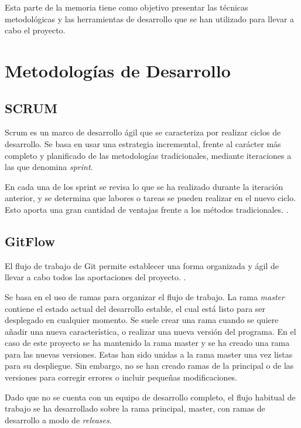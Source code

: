 
Esta parte de la memoria tiene como objetivo presentar las técnicas metodológicas y las herramientas de desarrollo que se han utilizado para llevar a cabo el proyecto. 



\section{Metodologías de Desarrollo}

\subsection{SCRUM}
\label{sub:scrum}

Scrum es un marco de desarrollo ágil que se caracteriza por realizar ciclos de desarrollo. Se basa en usar una estrategia incremental, frente al carácter más completo y planificado de las metodologías tradicionales, mediante iteraciones a las que denomina \textit{sprint}. 

En cada una de los sprint se revisa lo que se ha realizado durante la iteración anterior, y se determina que labores o tareas se pueden realizar en el nuevo ciclo. Esto aporta una gran cantidad de ventajas frente a los métodos tradicionales. \citep{wiki:SCRUM}.

\subsection{GitFlow}
\label{sub:gitflow}
El flujo de trabajo de Git permite establecer una forma organizada y ágil de llevar a cabo todos las aportaciones del proyecto. \citep{wiki:gitflow}.

Se basa en el uso de ramas para organizar el flujo de trabajo. La rama \textit{master} contiene el estado actual del desarrollo estable, el cual está listo para ser desplegado en cualquier momento. Se suele crear una rama cuando se quiere añadir una nueva característica, o realizar una nueva versión del programa. 
En el caso de este proyecto se ha mantenido la rama master y se ha creado una rama para las nuevas versiones. Estas han sido unidas a la rama master una vez listas para su despliegue.
Sin embargo, no se han creado ramas de la principal o de las versiones para corregir errores o incluir pequeñas modificaciones. 

Dado que no se cuenta con un equipo de desarrollo completo, el flujo habitual de trabajo se ha desarrollado sobre la rama principal, master, con ramas de desarrollo a modo de \textit{releases}. 

